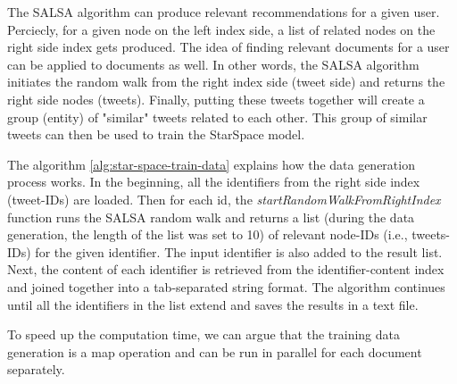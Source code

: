 The SALSA algorithm can produce relevant recommendations for a given user. Perciecly, for a given node on the left index side, a list of related nodes on the right side index gets produced. The idea of finding relevant documents for a user can be applied to documents as well. In other words, the SALSA algorithm initiates the random walk from the right index side (tweet side) and returns the right side nodes (tweets). Finally, putting these tweets together will create a group (entity) of "similar" tweets related to each other. This group of similar tweets can then be used to train the StarSpace model.


The algorithm \ref{alg:star-space-train-data} explains how the data generation process works. In the beginning, all the identifiers from the right side index (tweet-IDs) are loaded. Then for each id, the \emph{startRandomWalkFromRightIndex} function runs the SALSA random walk and returns a list (during the data generation, the length of the list was set to 10) of relevant node-IDs (i.e., tweets-IDs) for the given identifier. The input identifier is also added to the result list. Next, the content of each identifier is retrieved from the identifier-content index and joined together into a tab-separated string format. The algorithm continues until all the identifiers in the list extend and saves the results in a text file.


To speed up the computation time, we can argue that the training data generation is a map operation and can be run in parallel for each document separately.


